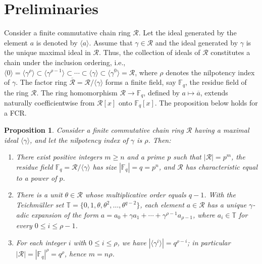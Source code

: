 \documentclass[12pt,a4paper]{article}
\newtheorem{proposition}[theorem]{Proposition}
\begin{document}
\section{Preliminaries}\label{sec:prelim}
Consider a finite commutative chain ring $\mathcal{R}$. Let the ideal generated by the element $a$ is denoted by $\langle a \rangle$. Assume that $\gamma \in \mathcal{R}$ and the ideal generated by $\gamma$ is the unique maximal ideal in $\mathcal{R}$. Thus, the collection of ideals of $\mathcal{R}$ constitutes a chain under the inclusion ordering, i.e., $\langle 0 \rangle = \langle \gamma^{\rho} \rangle \subset \langle \gamma^{\rho-1} \rangle \subset \cdots \subset \langle \gamma \rangle \subset \langle \gamma^{0} \rangle = \mathcal{R}$, where $\rho$ denotes the nilpotency index of $\gamma$. The factor ring $\mathcal{\overline{R}}=\mathcal{R}/\langle \gamma\rangle$ forms a finite field, say $\mathbb{F}_{q}$, the residue field of the ring $\mathcal{R}$. The ring homomorphism $\mathcal{R} \to \mathbb{F}_{q}$, defined by $a \mapsto \overline{a}$, extends naturally coefficientwise from $\mathcal{R}[x]$ onto $\mathbb{F}_{q}[x]$.
The proposition below holds for a FCR.

\begin{proposition}\label{prop:first}
\cite{dinh2017repeated}
Consider a finite commutative chain ring $\mathcal{R}$ having a maximal ideal $\langle \gamma \rangle$, and let the nilpotency index of $\gamma$ is $\rho$. Then:

\begin{enumerate}
\item[(a)] There exist positive integers $m \ge n$ and a prime $p$ such that $|\mathcal{R}| = p^m$, the residue field $\mathbb{F}_q = \mathcal{R}/\langle \gamma \rangle$ has size $|\mathbb{F}_q| = q= p^n$, and  $\mathcal{R}$ has characteristic equal to a power of $p$.

\item[(b)] There is a unit $\theta \in \mathcal{R}$ whose multiplicative order equals $q-1$. With the Teichm\"uller set $\mathbb{T}=\{0,1,\theta,\theta^2,\ldots,\theta^{q-2}\}$, each element $a \in \mathcal{R}$ has a unique $\gamma$-adic expansion of the form $a=a_0+\gamma a_1+\cdots+\gamma^{\rho-1}a_{\rho-1}$, where $a_i \in \mathbb{T}$ for every $0 \leq i \leq \rho-1$.

\item[(c)] For each integer $i$ with $0 \le i \le \rho$, we have $|\langle \gamma^i \rangle| = q^{\rho - i}$; in particular $|\mathcal{R}| =|\mathbb{F}_q|^{\rho} =q^{\rho}$, hence $m = n\rho$.
\end{enumerate}
\end{proposition}
\end{document}
